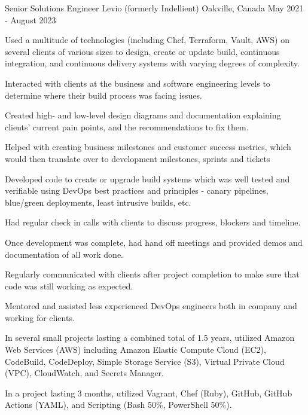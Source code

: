 \begin{cventries}
  \cventry
    {Senior Solutions Engineer} %
    {Levio (formerly Indellient)} %
    {Oakville, Canada} %
    {May 2021 - August 2023} %
    {
      \begin{cvitems} %
        \item {Used a multitude of technologies (including Chef, Terraform, Vault, AWS) on several clients of various sizes to design, create or update build, continuous integration, and continuous delivery systems with varying degrees of complexity.}
        \item {Interacted with clients at the business and software engineering levels to determine where their build process was facing issues.}
        \item {Created high- and low-level design diagrams and documentation explaining clients' current pain points, and the recommendations to fix them.}
        \item {Helped with creating business milestones and customer success metrics, which would then translate over to development milestones, sprints and tickets}
        \item {Developed code to create or upgrade build systems which was well tested and verifiable using DevOps best practices and principles - canary pipelines, blue/green deployments, least intrusive builds, etc.}
        \item {Had regular check in calls with clients to discuss progress, blockers and timeline.}
        \item {Once development was complete, had hand off meetings and provided demos and documentation of all work done.}
        \item {Regularly communicated with clients after project completion to make sure that code was still working as expected.}
        \item {Mentored and assisted less experienced DevOps engineers both in company and working for clients.}
        \item {In several small projects lasting a combined total of 1.5 years, utilized Amazon Web Services (AWS) including Amazon Elastic Compute Cloud (EC2), CodeBuild, CodeDeploy, Simple Storage Service (S3), Virtual Private Cloud (VPC), CloudWatch, and Secrets Manager.}
        \item {In a project lasting 3 months, utilized Vagrant, Chef (Ruby), GitHub, GitHub Actions (YAML), and Scripting (Bash 50\%, PowerShell 50\%).}

\end{cvitems}}
\end{cventries}
